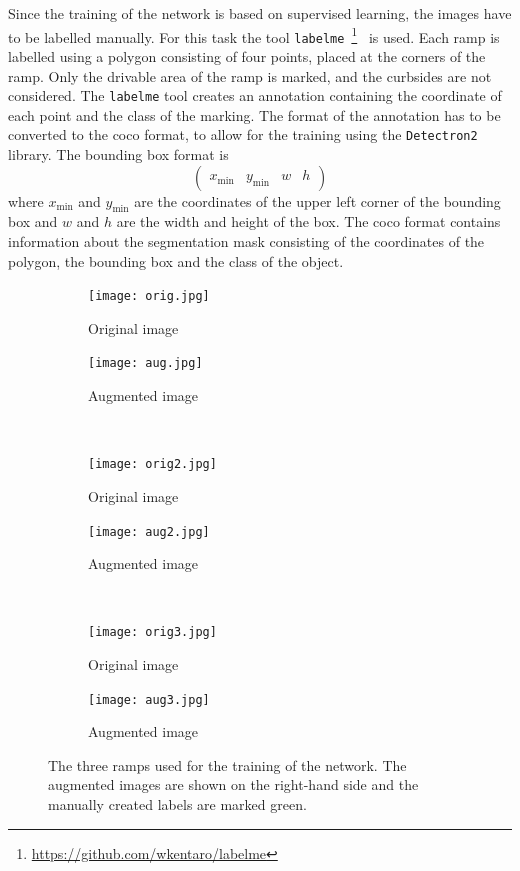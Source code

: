 Since the training of the network is based on supervised learning, the images have to be labelled manually.
For this task the tool \texttt{labelme}~\footnote{\url{https://github.com/wkentaro/labelme}}~\cite{Wada2018} is used.
Each ramp is labelled using a polygon consisting of four points, placed at the corners of the ramp.
Only the drivable area of the ramp is marked, and the curbsides are not considered.
The \texttt{labelme} tool creates an annotation containing the coordinate of each point and the class of the marking.
The format of the annotation has to be converted to the \gls{coco} format, to allow for the training using the \texttt{Detectron2} library.
The bounding box format is
\[
    \begin{pmatrix}
        x_\mathrm{min} & y_\mathrm{min} & w & h
    \end{pmatrix}
\]
where $x_\mathrm{min}$ and $y_\mathrm{min}$ are the coordinates of the upper left corner of the bounding box and $w$ and $h$ are the width and height of the box.
The \gls{coco} format contains information about the segmentation mask consisting of the coordinates of the polygon, the bounding box and the class of the object.
\begin{figure}[htb]
    \centering
    \begin{subfigure}{.47\linewidth}
        \centering
        \texttt{[image: orig.jpg]}
        \caption{Original image}
    \end{subfigure}
    \begin{subfigure}{.47\linewidth}
        \centering
        \texttt{[image: aug.jpg]}
        \caption{Augmented image}
    \end{subfigure}
    \\
    \begin{subfigure}{.47\linewidth}
        \centering
        \texttt{[image: orig2.jpg]}
        \caption{Original image}
    \end{subfigure}
    \begin{subfigure}{.47\linewidth}
        \centering
        \texttt{[image: aug2.jpg]}
        \caption{Augmented image}
    \end{subfigure}
    \\
    \begin{subfigure}{.47\linewidth}
        \centering
        \texttt{[image: orig3.jpg]}
        \caption{Original image}
    \end{subfigure}
    \begin{subfigure}{.47\linewidth}
        \centering
        \texttt{[image: aug3.jpg]}
        \caption{Augmented image}
    \end{subfigure}
    \caption[Examples of augmented images]{The three ramps used for the training of the network. The augmented images are shown on the right-hand side and the manually created labels are marked green.}
    \label{fig:img_augmentated}
\end{figure}


